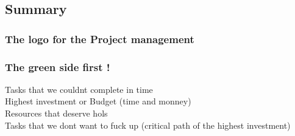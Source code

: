 \documentclass[8pt]{article} %
\begin{document}


\subsection{Summary}

\subsubsection{The logo for the Project management}
%


%

%

%

%

%

\subsubsection{The green side first !}
Tasks that we couldnt complete in time\\
Highest investment or Budget (time and monney)\\
Resources that deserve hols\\
Tasks that we dont want to fuck up (critical path of the highest investment)\\
\end{document}
